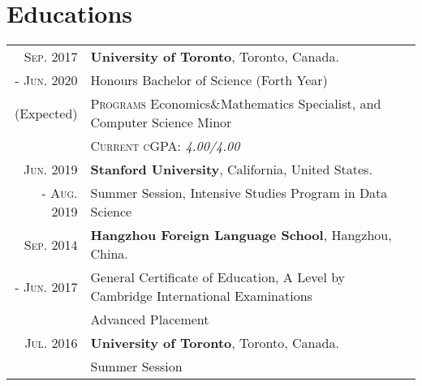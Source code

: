 \documentclass[a4paper,10pt]{article}
\begin{document}
\section{Educations}
\begin{tabular}{rl}

    \textsc{Sep.} 2017 & \textbf{University of Toronto}, Toronto, Canada. \\
    - \textsc{Jun.} 2020 & {Honours Bachelor of Science} (Forth Year) \\
    (Expected)& \quad \textsc{Programs} Economics\&Mathematics Specialist, and Computer Science Minor \\
    & \quad \textsc{Current cGPA: } \emph{4.00/4.00}\\
    \textsc{Jun.} 2019 & \textbf{Stanford University}, California, United States. \\
    - \textsc{Aug.} 2019 & Summer Session, Intensive Studies Program in Data Science\\
    \textsc{Sep.} 2014 & \textbf{Hangzhou Foreign Language School}, Hangzhou, China.\\
    - \textsc{Jun.} 2017 & {General Certificate of Education, A Level by Cambridge International Examinations} \\
    & {Advanced Placement}\\ %
    \textsc{Jul.} 2016 & \textbf{University of Toronto}, Toronto, Canada. \\
    & Summer Session

\end{tabular}
\end{document}
